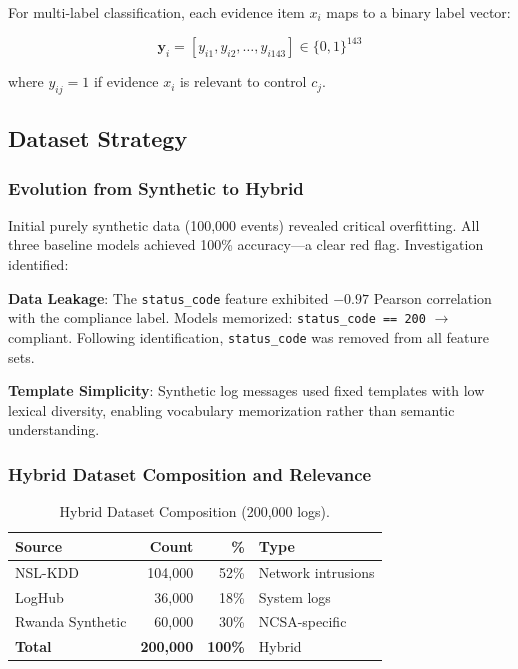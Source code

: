 \documentclass[futureinternet,article,submit,pdftex,moreauthors]{Definitions/mdpi}
\begin{document}
For multi-label classification, each evidence item $x_i$ maps to a binary label vector:
\begin{linenomath}
\begin{equation}
\mathbf{y}_i = [y_{i1}, y_{i2}, \ldots, y_{i143}] \in \{0,1\}^{143}
\label{eq:multilabel}
\end{equation}
\end{linenomath}
where $y_{ij} = 1$ if evidence $x_i$ is relevant to control $c_j$.

\subsection{Dataset Strategy}

\subsubsection{Evolution from Synthetic to Hybrid}

Initial purely synthetic data (100{,}000 events) revealed critical overfitting. All three
baseline models achieved 100\% accuracy---a clear red flag. Investigation identified:

\textbf{Data Leakage}: The \texttt{status\_code} feature exhibited $-0.97$ Pearson correlation
with the compliance label. Models memorized: \texttt{status\_code == 200} $\rightarrow$
compliant. Following identification, \texttt{status\_code} was removed from all feature sets.

\textbf{Template Simplicity}: Synthetic log messages used fixed templates with low lexical
diversity, enabling vocabulary memorization rather than semantic understanding.

\subsubsection{Hybrid Dataset Composition and Relevance}

\begin{table}[H]
\caption{Hybrid Dataset Composition (200{,}000 logs).\label{tab:dataset}}
\begin{tabularx}{\textwidth}{lrrX}
\toprule
\textbf{Source} & \textbf{Count} & \textbf{\%} & \textbf{Type} \\
\midrule
NSL-KDD~\cite{nslkdd} & 104{,}000 & 52\% & Network intrusions \\
LogHub~\cite{loghub} & 36{,}000 & 18\% & System logs \\
Rwanda Synthetic & 60{,}000 & 30\% & NCSA-specific \\
\midrule
\textbf{Total} & \textbf{200{,}000} & \textbf{100\%} & Hybrid \\
\bottomrule
\end{tabularx}
\end{table}
\end{document}
